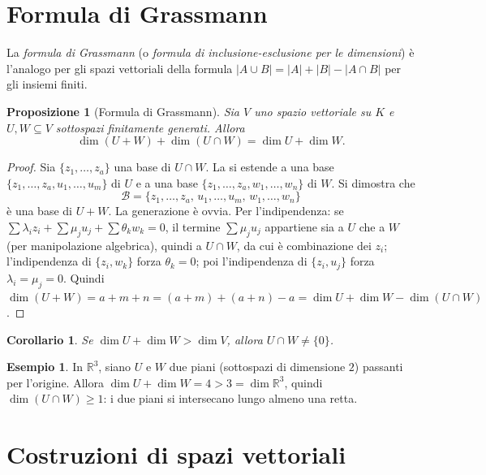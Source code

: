 \documentclass[11pt, a4paper]{book}
\theoremstyle{definition}
\newtheorem{esempio}[definizione]{Esempio}
\theoremstyle{plain}
\newtheorem{proposizione}[definizione]{Proposizione}
\newtheorem{corollario}[definizione]{Corollario}
\theoremstyle{remark}
\newcommand{\R}{\mathbb{R}}
\begin{document}
\section{Formula di Grassmann}

La \emph{formula di Grassmann} (o \emph{formula di inclusione-esclusione per le dimensioni}) è l'analogo per gli spazi vettoriali della formula $|A \cup B| = |A| + |B| - |A \cap B|$ per gli insiemi finiti.

\begin{proposizione}[Formula di Grassmann]
Sia $V$ uno spazio vettoriale su $K$ e $U, W \subseteq V$ sottospazi finitamente generati. Allora
\[
  \dim(U + W) + \dim(U \cap W) = \dim U + \dim W.
\]
\end{proposizione}

\begin{proof}
Sia $\{z_1,\ldots,z_a\}$ una base di $U \cap W$. La si estende a una base $\{z_1,\ldots,z_a, u_1,\ldots,u_m\}$ di $U$ e a una base $\{z_1,\ldots,z_a, w_1,\ldots,w_n\}$ di $W$. Si dimostra che
\[
  \mathcal{B} = \{z_1,\ldots,z_a,\, u_1,\ldots,u_m,\, w_1,\ldots,w_n\}
\]
è una base di $U + W$. La generazione è ovvia. Per l'indipendenza: se $\sum \lambda_i z_i + \sum \mu_j u_j + \sum \theta_k w_k = 0$, il termine $\sum \mu_j u_j$ appartiene sia a $U$ che a $W$ (per manipolazione algebrica), quindi a $U \cap W$, da cui è combinazione dei $z_i$; l'indipendenza di $\{z_i, w_k\}$ forza $\theta_k = 0$; poi l'indipendenza di $\{z_i, u_j\}$ forza $\lambda_i = \mu_j = 0$. Quindi
$\dim(U+W) = a+m+n = (a+m)+(a+n)-a = \dim U + \dim W - \dim(U \cap W)$.
\end{proof}

\begin{corollario}
Se $\dim U + \dim W > \dim V$, allora $U \cap W \neq \{0\}$.
\end{corollario}

\begin{exbox}
\begin{esempio}
In $\R^3$, siano $U$ e $W$ due piani (sottospazi di dimensione $2$) passanti per l'origine. Allora $\dim U + \dim W = 4 > 3 = \dim \R^3$, quindi $\dim(U \cap W) \geq 1$: i due piani si intersecano lungo almeno una retta.
\end{esempio}
\end{exbox}

\section{Costruzioni di spazi vettoriali}
\end{document}
